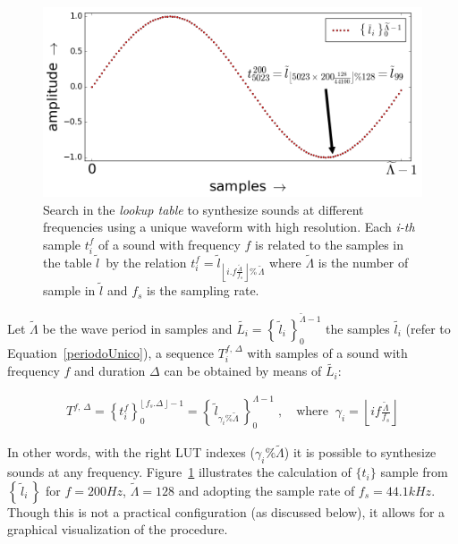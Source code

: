 \begin{figure}
    \centering
        \includegraphics[width=.7\textwidth]{figures/lut_}
    \caption{Search in the \emph{lookup table} to synthesize sounds at different frequencies using a unique waveform with high resolution.
	Each \emph{i-th} sample $t_i^f$ of a sound with frequency $f$ is related to the samples in the table $\widetilde{l}$\, by the relation $t_i^{f}=\widetilde{l}_{\left\lfloor i.f\frac{\widetilde{\Lambda}}{f_s} \right\rfloor \%\,\widetilde{\Lambda}}$ where $\widetilde{\Lambda}$ is the number of sample in $\widetilde{l}$ and $f_s$ is the sampling rate.}
        \label{fig:lut}
\end{figure}

Let $\widetilde{\Lambda}$ be the wave period in samples and $\widetilde{L_i} = \left\{\, \widetilde{l}_i \,\right\}_0^{\widetilde{\Lambda} -1}$ the samples $\widetilde{l_i}$ (refer to Equation~\ref{periodoUnico}), a sequence $T_i^{f,\,\Delta}$ with samples of a sound with frequency $f$ and duration $\Delta$ can be obtained by means of $\widetilde{L_i}$:

\begin{equation}\label{eq:lut}
\begin{split}
T^{f,\,\Delta}=\left\{t_i^f\right\}_0^{\lfloor \, f_s . \Delta \, \rfloor -1} = \left\{ \, \widetilde{l}_{\gamma_i \% \widetilde{\Lambda} }\, \right\}_{0}^{\Lambda-1}\; , \quad \text{where} \;\; \gamma_i = \left \lfloor i f \frac{ \widetilde{\Lambda}}{f_s} \right \rfloor  
\end{split}
\end{equation}

In other words, with the right LUT indexes ($\gamma_i\%\widetilde{\Lambda}$) it is possible to synthesize sounds at any frequency. Figure~\ref{fig:lut} illustrates the calculation of $\{t_i\}$ sample from $\left\{\,\widetilde{l}_i\,\right\}$ for $f=200Hz$, $\widetilde{\Lambda}=128$ and adopting the sample rate of $f_s=44.1kHz$. Though this is not a practical configuration (as discussed below), it allows for a graphical visualization of the procedure.

